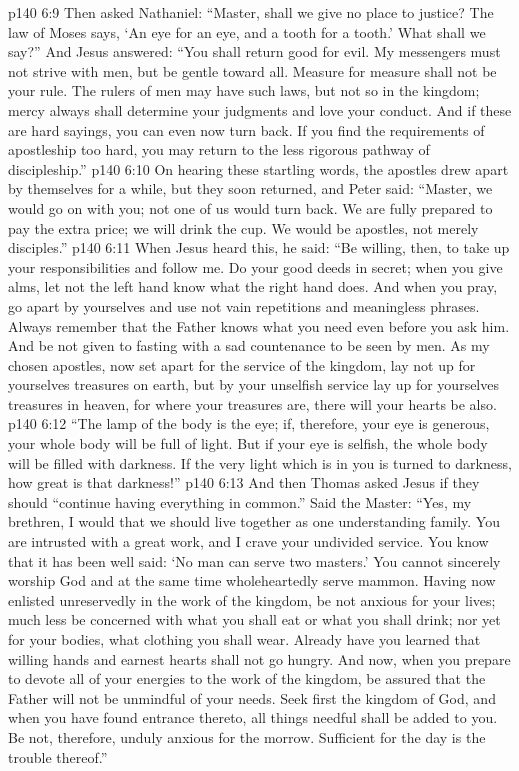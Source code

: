 \vs p140 6:9 Then asked Nathaniel: “Master, shall we give no place to justice? The law of Moses says, ‘An eye for an eye, and a tooth for a tooth.’ What shall we say?” And Jesus answered: \textcolor{ubdarkred}{“You shall return good for evil. My messengers must not strive with men, but be gentle toward all. Measure for measure shall not be your rule. The rulers of men may have such laws, but not so in the kingdom; mercy always shall determine your judgments and love your conduct. And if these are hard sayings, you can even now turn back. If you find the requirements of apostleship too hard, you may return to the less rigorous pathway of discipleship.”}
\vs p140 6:10 On hearing these startling words, the apostles drew apart by themselves for a while, but they soon returned, and Peter said: “Master, we would go on with you; not one of us would turn back. We are fully prepared to pay the extra price; we will drink the cup. We would be apostles, not merely disciples.”
\vs p140 6:11 When Jesus heard this, he said: \textcolor{ubdarkred}{“Be willing, then, to take up your responsibilities and follow me. Do your good deeds in secret; when you give alms, let not the left hand know what the right hand does. And when you pray, go apart by yourselves and use not vain repetitions and meaningless phrases. Always remember that the Father knows what you need even before you ask him. And be not given to fasting with a sad countenance to be seen by men. As my chosen apostles, now set apart for the service of the kingdom, lay not up for yourselves treasures on earth, but by your unselfish service lay up for yourselves treasures in heaven, for where your treasures are, there will your hearts be also.}
\vs p140 6:12 \textcolor{ubdarkred}{“The lamp of the body is the eye; if, therefore, your eye is generous, your whole body will be full of light. But if your eye is selfish, the whole body will be filled with darkness. If the very light which is in you is turned to darkness, how great is that darkness!”}
\vs p140 6:13 And then Thomas asked Jesus if they should “continue having everything in common.” Said the Master: \textcolor{ubdarkred}{“Yes, my brethren, I would that we should live together as one understanding family. You are intrusted with a great work, and I crave your undivided service. You know that it has been well said: ‘No man can serve two masters.’ You cannot sincerely worship God and at the same time wholeheartedly serve mammon. Having now enlisted unreservedly in the work of the kingdom, be not anxious for your lives; much less be concerned with what you shall eat or what you shall drink; nor yet for your bodies, what clothing you shall wear. Already have you learned that willing hands and earnest hearts shall not go hungry. And now, when you prepare to devote all of your energies to the work of the kingdom, be assured that the Father will not be unmindful of your needs. Seek first the kingdom of God, and when you have found entrance thereto, all things needful shall be added to you. Be not, therefore, unduly anxious for the morrow. Sufficient for the day is the trouble thereof.”}
